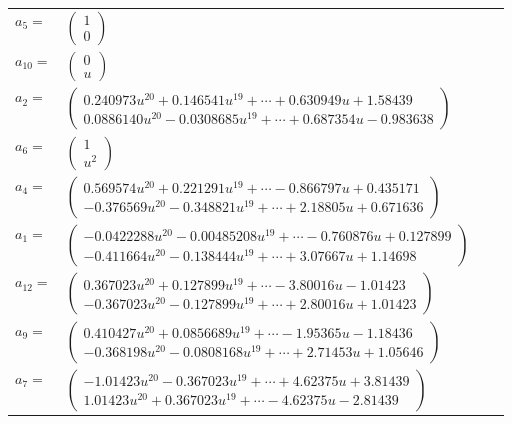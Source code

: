 \documentclass[1p]{elsarticle_modified}
\theoremstyle{definition}
\begin{document}
\begin{tabular}{m{7pt} m{180pt} m{7pt} m{180pt} }
\flushright $a_{5}=$&$\begin{pmatrix}1\\0\end{pmatrix}$ \\
\flushright $a_{10}=$&$\begin{pmatrix}0\\u\end{pmatrix}$ \\
\flushright $a_{2}=$&$\begin{pmatrix}0.240973 u^{20}+0.146541 u^{19}+\cdots+0.630949 u+1.58439\\0.0886140 u^{20}-0.0308685 u^{19}+\cdots+0.687354 u-0.983638\end{pmatrix}$ \\
\flushright $a_{6}=$&$\begin{pmatrix}1\\u^2\end{pmatrix}$ \\
\flushright $a_{4}=$&$\begin{pmatrix}0.569574 u^{20}+0.221291 u^{19}+\cdots-0.866797 u+0.435171\\-0.376569 u^{20}-0.348821 u^{19}+\cdots+2.18805 u+0.671636\end{pmatrix}$ \\
\flushright $a_{1}=$&$\begin{pmatrix}-0.0422288 u^{20}-0.00485208 u^{19}+\cdots-0.760876 u+0.127899\\-0.411664 u^{20}-0.138444 u^{19}+\cdots+3.07667 u+1.14698\end{pmatrix}$ \\
\flushright $a_{12}=$&$\begin{pmatrix}0.367023 u^{20}+0.127899 u^{19}+\cdots-3.80016 u-1.01423\\-0.367023 u^{20}-0.127899 u^{19}+\cdots+2.80016 u+1.01423\end{pmatrix}$ \\
\flushright $a_{9}=$&$\begin{pmatrix}0.410427 u^{20}+0.0856689 u^{19}+\cdots-1.95365 u-1.18436\\-0.368198 u^{20}-0.0808168 u^{19}+\cdots+2.71453 u+1.05646\end{pmatrix}$ \\
\flushright $a_{7}=$&$\begin{pmatrix}-1.01423 u^{20}-0.367023 u^{19}+\cdots+4.62375 u+3.81439\\1.01423 u^{20}+0.367023 u^{19}+\cdots-4.62375 u-2.81439\end{pmatrix}$ \\

\end{tabular}
\end{document}
